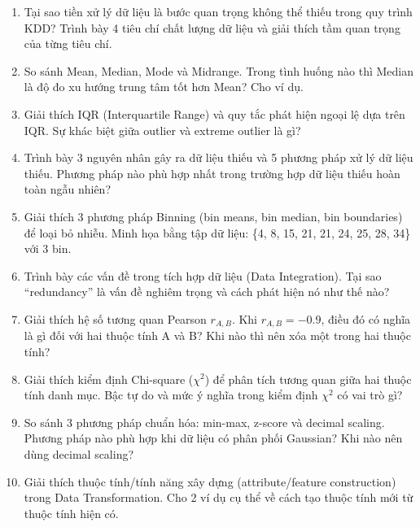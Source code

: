 \documentclass[10pt]{article}
\begin{document}
\begin{enumerate}[leftmargin=*, label=\textbf{Câu \arabic*.}]

    \item Tại sao tiền xử lý dữ liệu là bước quan trọng không thể thiếu trong quy trình KDD? Trình bày 4 tiêu chí chất lượng dữ liệu và giải thích tầm quan trọng của từng tiêu chí.

    \item So sánh Mean, Median, Mode và Midrange. Trong tình huống nào thì Median là độ đo xu hướng trung tâm tốt hơn Mean? Cho ví dụ.

    \item Giải thích IQR (Interquartile Range) và quy tắc phát hiện ngoại lệ dựa trên IQR. Sự khác biệt giữa outlier và extreme outlier là gì?

    \item Trình bày 3 nguyên nhân gây ra dữ liệu thiếu và 5 phương pháp xử lý dữ liệu thiếu. Phương pháp nào phù hợp nhất trong trường hợp dữ liệu thiếu hoàn toàn ngẫu nhiên?

    \item Giải thích 3 phương pháp Binning (bin means, bin median, bin boundaries) để loại bỏ nhiễu. Minh họa bằng tập dữ liệu: \{4, 8, 15, 21, 21, 24, 25, 28, 34\} với 3 bin.

    \item Trình bày các vấn đề trong tích hợp dữ liệu (Data Integration). Tại sao ``redundancy'' là vấn đề nghiêm trọng và cách phát hiện nó như thế nào?

    \item Giải thích hệ số tương quan Pearson $r_{A,B}$. Khi $r_{A,B} = -0.9$, điều đó có nghĩa là gì đối với hai thuộc tính A và B? Khi nào thì nên xóa một trong hai thuộc tính?

    \item Giải thích kiểm định Chi-square ($\chi^2$) để phân tích tương quan giữa hai thuộc tính danh mục. Bậc tự do và mức ý nghĩa trong kiểm định $\chi^2$ có vai trò gì?

    \item So sánh 3 phương pháp chuẩn hóa: min-max, z-score và decimal scaling. Phương pháp nào phù hợp khi dữ liệu có phân phối Gaussian? Khi nào nên dùng decimal scaling?

    \item Giải thích thuộc tính/tính năng xây dựng (attribute/feature construction) trong Data Transformation. Cho 2 ví dụ cụ thể về cách tạo thuộc tính mới từ thuộc tính hiện có.


\end{enumerate}
\end{document}
